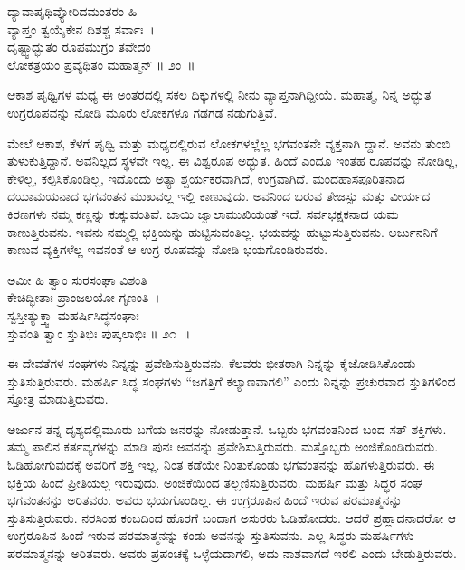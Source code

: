 \begin{shloka}
ದ್ಯಾವಾಪೃಥಿವ್ಯೋರಿದಮಂತರಂ ಹಿ \\ ವ್ಯಾಪ್ತಂ ತ್ವಯೈಕೇನ ದಿಶಶ್ಚ ಸರ್ವಾಃ~।\\ದೃಷ್ಟ್ವಾದ್ಭುತಂ ರೂಪಮುಗ್ರಂ ತವೇದಂ \\ ಲೋಕತ್ರಯಂ ಪ್ರವ್ಯಥಿತಂ ಮಹಾತ್ಮನ್ \hfill॥ ೨ಂ~॥
\end{shloka}

\begin{artha}
ಆಕಾಶ ಪೃಥ್ವಿಗಳ ಮಧ್ಯ ಈ ಅಂತರದಲ್ಲಿ ಸಕಲ ದಿಕ್ಕುಗಳಲ್ಲಿ ನೀನು ವ್ಯಾಪ್ತನಾಗಿದ್ದೀಯೆ. ಮಹಾತ್ಮ, ನಿನ್ನ ಅದ್ಭುತ ಉಗ್ರರೂಪವನ್ನು ನೋಡಿ ಮೂರು ಲೋಕಗಳೂ ಗಡಗಡ ನಡುಗುತ್ತಿವೆ.
\end{artha}

\newpage

ಮೇಲೆ ಆಕಾಶ, ಕೆಳಗೆ ಪೃಥ್ವಿ ಮತ್ತು ಮಧ್ಯದಲ್ಲಿರುವ ಲೋಕಗಳಲ್ಲೆಲ್ಲ ಭಗವಂತನೇ ವ್ಯಕ್ತನಾಗಿ ದ್ದಾನೆ. ಅವನು ತುಂಬಿ ತುಳುಕುತ್ತಿದ್ದಾನೆ. ಅವನಿಲ್ಲದ ಸ್ಥಳವೇ ಇಲ್ಲ. ಈ ವಿಶ್ವರೂಪ ಅದ್ಭುತ. ಹಿಂದೆ ಎಂದೂ ಇಂತಹ ರೂಪವನ್ನು ನೋಡಿಲ್ಲ, ಕೇಳಿಲ್ಲ, ಕಲ್ಪಿಸಿಕೊಂಡಿಲ್ಲ, ಇದೊಂದು ಅತ್ಯಾ ಶ್ಚರ್ಯಕರವಾಗಿದೆ, ಉಗ್ರವಾಗಿದೆ. ಮಂದಹಾಸಪೂರಿತನಾದ ದಯಾಮಯನಾದ ಭಗವಂತನ ಮುಖವಲ್ಲ ಇಲ್ಲಿ ಕಾಣುವುದು. ಅವನಿಂದ ಬರುವ ತೇಜಸ್ಸು ಮತ್ತು ವೀರ್ಯದ ಕಿರಣಗಳು ನಮ್ಮ ಕಣ್ಣನ್ನು ಕುಕ್ಕುವಂತಿವೆ. ಬಾಯಿ ಜ್ವಾಲಾಮುಖಿಯಂತೆ ಇದೆ. ಸರ್ವಭಕ್ಷಕನಾದ ಯಮ ಕಾಣುತ್ತಿರುವನು. ಇವನು ನಮ್ಮಲ್ಲಿ ಭಕ್ತಿಯನ್ನು ಹುಟ್ಟಿಸುವಂತಿಲ್ಲ. ಭಯವನ್ನು ಹುಟ್ಟುಸುತ್ತಿರುವನು. ಅರ್ಜುನನಿಗೆ ಕಾಣುವ ವ್ಯಕ್ತಿಗಳೆಲ್ಲ ಇವನಂತೆ ಆ ಉಗ್ರ ರೂಪವನ್ನು ನೋಡಿ ಭಯಗೊಂಡಿರುವರು.

\begin{shloka}
ಅಮೀ ಹಿ ತ್ವಾಂ ಸುರಸಂಘಾ ವಿಶಂತಿ \\ ಕೇಚಿದ್ಭೀತಾಃ ಪ್ರಾಂಜಲಯೋ ಗೃಣಂತಿ~।\\ಸ್ವಸ್ತೀತ್ಯುಕ್ತ್ವಾ ಮಹರ್ಷಿಸಿದ್ಧಸಂಘಾಃ \\ ಸ್ತುವಂತಿ ತ್ವಾಂ ಸ್ತುತಿಭಿಃ ಪುಷ್ಕಲಾಭಿಃ \hfill॥ ೨೧~॥
\end{shloka}

\begin{artha}
ಈ ದೇವತೆಗಳ ಸಂಘಗಳು ನಿನ್ನನ್ನು ಪ್ರವೇಶಿಸುತ್ತಿರುವನು. ಕೆಲವರು ಭೀತರಾಗಿ ನಿನ್ನನ್ನು ಕೈಜೋಡಿಸಿಕೊಂಡು ಸ್ತುತಿಸುತ್ತಿರುವರು. ಮಹರ್ಷಿ ಸಿದ್ಧ ಸಂಘಗಳು “ಜಗತ್ತಿಗೆ ಕಲ್ಯಾಣವಾಗಲಿ” ಎಂದು ನಿನ್ನನ್ನು ಪ್ರಚುರವಾದ ಸ್ತುತಿಗಳಿಂದ ಸ್ತೋತ್ರ ಮಾಡುತ್ತಿರುವರು.
\end{artha}

ಅರ್ಜುನ ತನ್ನ ದೃಶ್ಯದಲ್ಲಿಮೂರು ಬಗೆಯ ಜನರನ್ನು ನೋಡುತ್ತಾನೆ. ಒಬ್ಬರು ಭಗವಂತನಿಂದ ಬಂದ ಸತ್ ಶಕ್ತಿಗಳು. ತಮ್ಮ ಪಾಲಿನ ಕರ್ತವ್ಯಗಳನ್ನು ಮಾಡಿ ಪುನಃ ಅವನನ್ನು ಪ್ರವೇಶಿಸುತ್ತಿರುವರು. ಮತ್ತೊಬ್ಬರು ಅಂಜಿಕೊಂಡಿರುವರು. ಓಡಿಹೋಗುವುದಕ್ಕೆ ಅವರಿಗೆ ಶಕ್ತಿ ಇಲ್ಲ. ನಿಂತ ಕಡೆಯೇ ನಿಂತುಕೊಂಡು ಭಗವಂತನನ್ನು ಹೊಗಳುತ್ತಿರುವರು. ಈ ಭಕ್ತಿಯ ಹಿಂದೆ ಪ್ರೀತಿಯಲ್ಲ ಇರುವುದು. ಅಂಜಿಕೆಯಿಂದ ತಲ್ಲಣಿಸುತ್ತಿರುವರು. ಮಹರ್ಷಿ ಮತ್ತು ಸಿದ್ಧರ ಸಂಘ ಭಗವಂತನನ್ನು ಅರಿತವರು. ಅವರು ಭಯಗೊಂಡಿಲ್ಲ. ಈ ಉಗ್ರರೂಪಿನ ಹಿಂದೆ ಇರುವ ಪರಮಾತ್ಮನನ್ನು ಸ್ತುತಿಸುತ್ತಿರುವರು. ನರಸಿಂಹ ಕಂಬದಿಂದ ಹೊರಗೆ ಬಂದಾಗ ಅಸುರರು ಓಡಿಹೋದರು. ಆದರೆ ಪ್ರಹ್ಲಾದನಾದರೋ ಆ ಉಗ್ರರೂಪಿನ ಹಿಂದೆ ಇರುವ ಪರಮಾತ್ಮನನ್ನು ಕಂಡು ಅವನನ್ನು ಸ್ತುತಿಸುವನು. ಎಲ್ಲ ಸಿದ್ಧರು ಮಹರ್ಷಿಗಳು ಪರಮಾತ್ಮನನ್ನು ಅರಿತವರು. ಅವರು ಪ್ರಪಂಚಕ್ಕೆ ಒಳ್ಳೆಯದಾಗಲಿ, ಅದು ನಾಶವಾಗದೆ ಇರಲಿ ಎಂದು ಬೇಡುತ್ತಿರುವರು.

